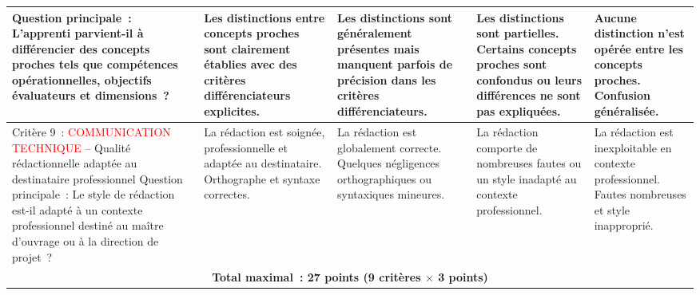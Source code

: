 \documentclass[a4paper,12pt,answers,addpoints]{exam}
\begin{document}
\begin{longtable}{|p{}|p{}|p{}|p{}|p{}|}
		\smallskip
		Question principale~: L'apprenti parvient-il à différencier des concepts proches tels que compétences opérationnelles, objectifs évaluateurs et dimensions~?
		&
		Les distinctions entre concepts proches sont clairement établies avec des critères différenciateurs explicites.
		&
		Les distinctions sont généralement présentes mais manquent parfois de précision dans les critères différenciateurs.
		&
		Les distinctions sont partielles. Certains concepts proches sont confondus ou leurs différences ne sont pas expliquées.
		&
		Aucune distinction n'est opérée entre les concepts proches. Confusion généralisée. \\
		\hline
		Critère 9~: \textcolor{red}{COMMUNICATION TECHNIQUE} -- Qualité rédactionnelle adaptée au destinataire professionnel
		\smallskip
		Question principale~: Le style de rédaction est-il adapté à un contexte professionnel destiné au maître d'ouvrage ou à la direction de projet~?
		&
		La rédaction est soignée, professionnelle et adaptée au destinataire. Orthographe et syntaxe correctes.
		&
		La rédaction est globalement correcte. Quelques négligences orthographiques ou syntaxiques mineures.
		&
		La rédaction comporte de nombreuses fautes ou un style inadapté au contexte professionnel.
		&
		La rédaction est inexploitable en contexte professionnel. Fautes nombreuses et style inapproprié. \\
		\hline
		\multicolumn{5}{|c|}{\textbf{Total maximal~: 27 points (9 critères $\times$ 3 points)}} \\
		\hline
	\end{longtable}
	
\end{document}
